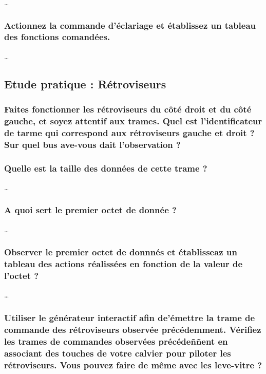 \documentclass{rapportECC}
\begin{document}
\dots

\subsubsection*{Actionnez la commande d'éclariage et établissez un tableau des fonctions comandées.}

\dots


\subsection{Etude pratique : Rétroviseurs}

\subsubsection*{Faites fonctionner les rétroviseurs du côté droit et du côté gauche, et soyez attentif aux trames. Quel est l'identificateur de tarme qui correspond aux rétroviseurs gauche et droit ?  Sur quel bus ave-vous dait l'observation ?}

\subsubsection*{Quelle est la taille des données de cette trame ?}

\dots

\subsubsection*{A quoi sert le premier octet de donnée ?}

\dots

\subsubsection*{Observer le premier octet de donnnés et établisseaz un tableau des actions  réalissées en fonction de la valeur de l'octet ?}

\dots

\subsubsection*{Utiliser le générateur interactif afin de'émettre la trame de commande des rétroviseurs observée précédemment. Vérifiez les trames de commandes observées précédeññent en associant des touches de votre calvier pour piloter les rétroviseurs. Vous pouvez faire de même avec les leve-vitre ?}
\end{document}
